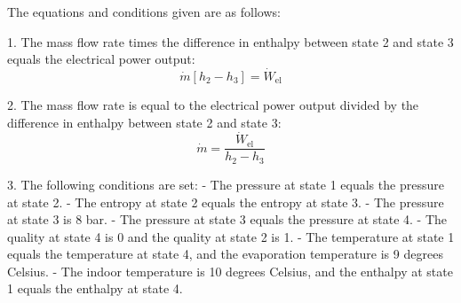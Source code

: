 The equations and conditions given are as follows:

1. The mass flow rate times the difference in enthalpy between state 2 and state 3 equals the electrical power output:
   \[
   \dot{m} \left[ h_2 - h_3 \right] = \dot{W}_{\text{el}}
   \]

2. The mass flow rate is equal to the electrical power output divided by the difference in enthalpy between state 2 and state 3:
   \[
   \dot{m} = \frac{\dot{W}_{\text{el}}}{h_2 - h_3}
   \]

3. The following conditions are set:
   - The pressure at state 1 equals the pressure at state 2.
   - The entropy at state 2 equals the entropy at state 3.
   - The pressure at state 3 is 8 bar.
   - The pressure at state 3 equals the pressure at state 4.
   - The quality at state 4 is 0 and the quality at state 2 is 1.
   - The temperature at state 1 equals the temperature at state 4, and the evaporation temperature is 9 degrees Celsius.
   - The indoor temperature is 10 degrees Celsius, and the enthalpy at state 1 equals the enthalpy at state 4.